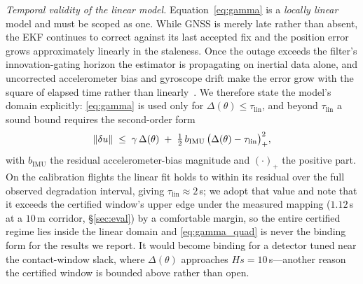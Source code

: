 \emph{Temporal validity of the linear model.} Equation~\eqref{eq:gamma} is a
\emph{locally linear} model and must be scoped as one. While GNSS is merely
late rather than absent, the EKF continues to correct against its last accepted
fix and the position error grows approximately linearly in the staleness. Once
the outage exceeds the filter's innovation-gating horizon the estimator is
propagating on inertial data alone, and uncorrected accelerometer bias and
gyroscope drift make the error grow with the square of elapsed time rather than
linearly~\cite{kong2024px4ekf}. We therefore state the model's domain
explicitly: \eqref{eq:gamma} is used only for
$\Delta(\theta)\le\tau_{\mathrm{lin}}$, and beyond $\tau_{\mathrm{lin}}$ a
sound bound requires the second-order form
\begin{equation}
\label{eq:gamma_quad}
\left\lVert \delta u\right\rVert\;\le\;\gamma\,\Delta(\theta)\;+\;\tfrac12\,b_{\mathrm{IMU}}\,\big(\Delta(\theta)-\tau_{\mathrm{lin}}\big)_{+}^{2},
\end{equation}
with $b_{\mathrm{IMU}}$ the residual accelerometer-bias magnitude and
$(\cdot)_+$ the positive part. On the calibration flights the linear fit holds
to within its residual over the full observed degradation interval, giving
$\tau_{\mathrm{lin}}\approx2$\,s; we adopt that value and note that it
exceeds the certified window's upper edge under the measured mapping
($1.12$\,s at a $10$\,m corridor, \S\ref{sec:eval}) by a comfortable margin,
so the entire certified regime lies inside the linear domain and
\eqref{eq:gamma_quad} is never the binding form for the results we report. It
would become binding for a detector tuned near the contact-window slack, where
$\Delta(\theta)$ approaches $Hs=10$\,s---another reason the certified window
is bounded above rather than open.

\begin{table}[t]
\centering
\caption{The measured delay-to-position rate $\gamma$, from three real PX4
flights (one benign reference, one GPS-jamming, one GPS-spoofing) in the
, self-referenced to the pre-attack median. ``noise''
is the pre-attack position-error $95$th percentile; $\gamma_{\mathrm{lsq}}$ and
$\gamma_{\mathrm{peak}}$ are the least-squares and peak-secant growth rates
after attack onset. These are the  pairings.}
\label{tab:whelan}
\scriptsize
\renewcommand{\arraystretch}{1.1}

\end{table}

